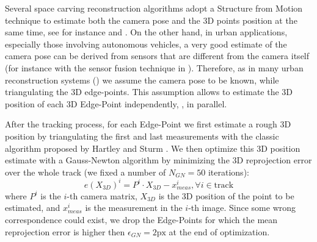 Several space carving reconstruction algorithms adopt a Structure from Motion technique to estimate both  the camera pose and the 3D points position at the same time, see for instance \cite{Yu_Lhuillier12, litvinov_lhuillier_13} and \cite{lovi_et_al_11}. 
On the other hand, in urban applications, especially those involving autonomous vehicles, a very good estimate of the camera pose can be derived from sensors that are different from the camera itself (for instance with the sensor fusion technique in \cite{Cucci_Matteucci14}). 
Therefore, as in  many urban reconstruction systems (\cite{ pollefeys_et_al_08,cornelis_et_al08})  we assume the camera pose to be known, while triangulating the 3D edge-points. This assumption allows to estimate the 3D position of each 3D Edge-Point independently, \ie, in parallel.

After the tracking process, for each Edge-Point we first estimate a rough 3D position by triangulating the first and last measurements with the classic algorithm proposed by Hartley and Sturm \cite{Hartley_Sturm97}. 
We then optimize this 3D position estimate with a Gauss-Newton algorithm by minimizing the 3D reprojection error over the whole track (we fixed a number of $N_{GN} = 50$ iterations):
\begin{equation}
 e(X_{3D})^i = P^i \cdot X_{3D} - x_{meas}^i, \forall i \in \text{track}
\end{equation}
where $P^i$ is the $i$-th camera matrix, $X_{3D}$ is the 3D position of the point to be estimated, and $x_{meas}^i$ is the  measurement in the $i$-th image.
Since some wrong correspondence could exist, we drop the Edge-Points for which the mean reprojection error is higher then $\epsilon_{GN} = 2\text{px}$ at the end of optimization.






